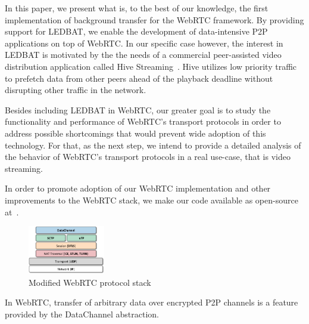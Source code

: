 \documentclass{sig-alternate}
\begin{document}
In this paper, we present what is, to the best of our knowledge, the first implementation
of background transfer for the WebRTC framework. By providing support for LEDBAT, we enable the
development of data-intensive P2P applications on top of WebRTC. In our specific case
however, the interest in LEDBAT is motivated by the the needs of a commercial peer-assisted
video distribution application called Hive Streaming~\cite{hive}. Hive utilizes low
priority traffic to prefetch data from other peers ahead of the playback deadline without
disrupting other traffic in the network.

Besides including LEDBAT in WebRTC, our greater goal is to study the functionality and
performance of WebRTC's transport protocols in order to address possible shortcomings that
would prevent wide adoption of this technology. For that, as the next step, we intend to
provide a detailed analysis of the behavior of WebRTC's transport protocols in a real
use-case, that is video streaming.

In order to promote adoption of our WebRTC implementation and other improvements to the
WebRTC stack, we make our code available as open-source at~\cite{webrtc-utp}.





\begin{figure}[t]
  \centering
    \includegraphics[width=0.30\textwidth]{figs/architecture3}
\vspace*{-0.38cm}
	\caption{Modified WebRTC protocol stack} \label{fig:architecture}
\vspace*{-0.4cm}
\end{figure}



In WebRTC, transfer of arbitrary data over encrypted P2P channels is a feature provided by
the DataChannel abstraction. 
\end{document}
